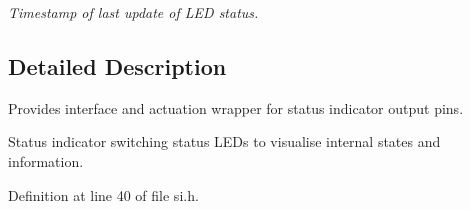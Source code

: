 \begin{DoxyCompactItemize}
\begin{DoxyCompactList}\small\item\em Timestamp of last update of L\+ED status. \end{DoxyCompactList}\end{DoxyCompactItemize}


\subsection{Detailed Description}
Provides interface and actuation wrapper for status indicator output pins. 

Status indicator switching status L\+E\+Ds to visualise internal states and information. 

Definition at line 40 of file si.\+h.

